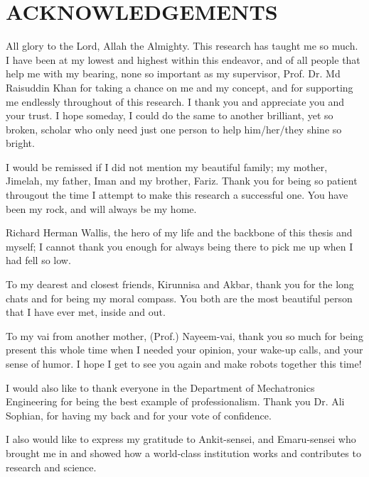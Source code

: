 

\chapter*{ACKNOWLEDGEMENTS}
All glory to the Lord, Allah the Almighty. This research has taught me so much. I have been
at my lowest and highest within this endeavor, and of all people that help me with my bearing,
none so important as my supervisor, Prof. Dr. Md Raisuddin Khan for taking a chance on me
and my concept, and for supporting me endlessly throughout of this research. 
I thank you and appreciate you and your trust.
I hope someday, I could do the same to another brilliant, yet so broken, 
scholar who only need just one person to help him/her/they shine so bright. 

I would be remissed if I did not mention my beautiful family; my mother, Jimelah, my father, Iman and
my brother, Fariz. Thank you for being so patient througout the time I attempt to make this research 
a successful one. You have been my rock, and will always be my home. 

Richard Herman Wallis, the hero of my life and the backbone
of this thesis and myself; I cannot thank you enough for always being 
there to pick me up when I had fell so low.

To my dearest and closest friends, Kirunnisa and Akbar, thank you for the long chats and for being
my moral compass. You both are the most beautiful person that 
I have ever met, inside and out.

To my vai from another mother, (Prof.) Nayeem-vai, thank you so much for being 
present this whole time when I needed your opinion, your wake-up calls, and your 
sense of humor. I hope I get to see you again and make robots together this time!

I would also like to thank everyone in the Department of Mechatronics Engineering for
being the best example of professionalism. Thank you Dr. Ali Sophian, for having my back and 
for your vote of confidence.

I also would like to express my gratitude to Ankit-sensei, and Emaru-sensei who brought me 
in and showed how a world-class institution works and contributes to research and science. 


